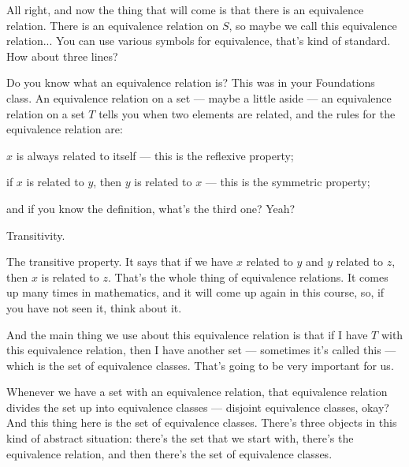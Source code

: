 \begin{speech}[00:38:05 - 00:40:21]
All right, and now the thing that will come is that there is an equivalence relation.  There is an equivalence relation on $S$, so maybe we call this equivalence relation...  You can use various symbols for equivalence, that's kind of standard. How about three lines?

Do you know what an equivalence relation is? This was in your Foundations class. An equivalence relation on a set --- maybe a little aside  --- an equivalence relation on a set $T$ tells you when two elements are related, and the rules for the equivalence relation are:

$x$ is always related to itself --- this is the reflexive property; 

if $x$ is related to $y$, then $y$ is related to $x$ --- this is the symmetric property; 

and if you know the definition, what's the third one? Yeah?
\end{speech}

\begin{student}
Transitivity.
\end{student}

\begin{speech}[00:40:21 - 00:41:00]
The transitive property. It says that if we have $x$ related to $y$ and $y$ related to $z$, then $x$ is related to $z$.  That's the whole thing of equivalence relations. It comes up many times in mathematics, and it will come up again in this course, so, if you have not seen it, think about it.

And the main thing we use about this equivalence relation is that if I have $T$ with this equivalence relation, then I have another set --- sometimes it's called this --- which is the set of equivalence classes.  That's going to be very important for us.

Whenever we have a set with an equivalence relation, that equivalence relation divides the set up into equivalence classes --- disjoint equivalence classes, okay? And this thing here is the set of equivalence classes. There's three objects in this kind of abstract situation: there's the set that we start with, there's the equivalence relation, and then there's the set of equivalence classes.
\end{speech}

